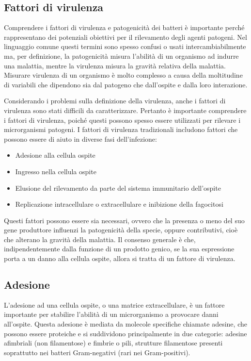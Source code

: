 \documentclass[../main.tex]{subfiles}
\begin{document}
\subsection{Fattori di virulenza}

Comprendere i fattori di virulenza e patogenicità dei batteri è importante perché rappresentano dei potenziali obiettivi per il rilevamento degli agenti patogeni. Nel linguaggio comune questi termini sono spesso confusi o usati intercambiabilmente ma, per definizione, la patogenicità misura l'abilità di un organismo ad indurre una malattia, mentre la virulenza misura la gravità relativa della malattia.\cite{watson_1949} Misurare virulenza di un organismo è molto complesso a causa della moltitudine di variabili che dipendono sia dal patogeno che dall'ospite e dalla loro interazione.\cite{casadevall_2001}

Considerando i problemi sulla definizione della virulenza, anche i fattori di virulenza sono stati difficili da caratterizzare. Pertanto è importante comprendere i fattori di virulenza, poiché questi possono spesso essere utilizzati per rilevare i microrganismi patogeni. I fattori di virulenza tradizionali includono fattori che possono essere di aiuto in diverse fasi dell'infezione: \cite{love_2008}

\begin{itemize}
	\itemsep0em 
	\item Adesione alla cellula ospite
	\item Ingresso nella cellula ospite
	\item Elusione del rilevamento da parte del sistema immunitario dell'ospite
	\item Replicazione intracellulare o extracellulare e inibizione della fagocitosi
\end{itemize}

Questi fattori possono essere sia necessari, ovvero che la presenza o meno del suo gene produttore influenzi la patogenicità della specie, oppure contributivi, cioè che alterano la gravità della malattia. Il consenso generale è che, indipendentemente dalla funzione di un prodotto genico, se la sua espressione porta a un danno alla cellula ospite, allora si tratta di un fattore di virulenza.\cite{casadevall_1999}

\subsection{Adesione}

L'adesione ad una cellula ospite, o una matrice extracellulare, è un fattore importante per stabilire l'abilità di un microrganismo a provocare danni all'ospite. Questa adesione è mediata da molecole specifiche chiamate adesine, che possono essere proteiche e si suddividono principalmente in due categorie: adesine afimbriali (non filamentose) e fimbrie o pili, strutture filamentose presenti soprattutto nei batteri Gram-negativi (rari nei Gram-positivi).
\end{document}
